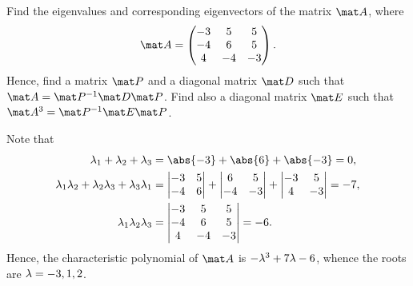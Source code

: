 \begin{problem}
    Find the eigenvalues and corresponding eigenvectors of the matrix $\mat A$, where \[\mat A = \begin{pmatrix}-3 & 5 & 5 \\ -4 & 6 & 5 \\ 4 & -4 & -3\end{pmatrix}.\] Hence, find a matrix $\mat P$ and a diagonal matrix $\mat D$ such that $\mat A = \mat P^{-1} \mat D \mat P$. Find also a diagonal matrix $\mat E$ such that $\mat A^3 = \mat P^{-1} \mat E \mat P$.
\end{problem}
\begin{solution}
    Note that
    \begin{align*}
        \l_1 + \l_2 + \l_3 &= \abs{-3} + \abs{6} + \abs{-3} = 0,\\
        \l_1 \l_2 + \l_2 \l_3 + \l_3 \l_1 &= \begin{vmatrix}-3 & 5 \\ -4 & 6\end{vmatrix} + \begin{vmatrix}6 & 5 \\ -4 & -3\end{vmatrix} + \begin{vmatrix}-3 & 5 \\ 4 & -3\end{vmatrix} = -7, \\
        \l_1 \l_2 \l_3 &= \begin{vmatrix}-3 & 5 & 5 \\ -4 & 6 & 5 \\ 4 & -4 & -3\end{vmatrix} = -6.
    \end{align*}
    Hence, the characteristic polynomial of $\mat A$ is $-\lambda^3 + 7\lambda -6$, whence the roots are $\lambda = -3, 1, 2$.
    

\end{solution}
